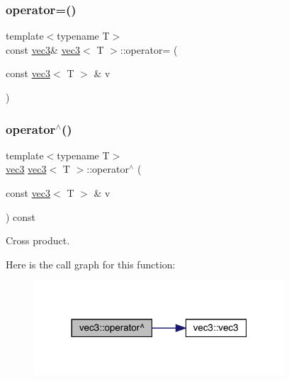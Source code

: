 \mbox{\label{structvec3_ad2cd7d64d02aa394c736ccc7054e5411}} 
\subsubsection{\texorpdfstring{operator=()}{operator=()}}
{\footnotesize\ttfamily template$<$typename T$>$ \\
const \mbox{\hyperlink{structvec3}{vec3}}\& \mbox{\hyperlink{structvec3}{vec3}}$<$ T $>$\+::operator= (\begin{DoxyParamCaption}\item[{const \mbox{\hyperlink{structvec3}{vec3}}$<$ T $>$ \&}]{v }\end{DoxyParamCaption})\hspace{0.3cm}{\ttfamily [inline]}}

\mbox{\label{structvec3_a6469fdfd7c378f5f30e299bc2e1e776a}} 
\subsubsection{\texorpdfstring{operator$^\wedge$()}{operator^()}}
{\footnotesize\ttfamily template$<$typename T$>$ \\
\mbox{\hyperlink{structvec3}{vec3}} \mbox{\hyperlink{structvec3}{vec3}}$<$ T $>$\+::operator$^\wedge$ (\begin{DoxyParamCaption}\item[{const \mbox{\hyperlink{structvec3}{vec3}}$<$ T $>$ \&}]{v }\end{DoxyParamCaption}) const\hspace{0.3cm}{\ttfamily [inline]}}



Cross product. 

Here is the call graph for this function\+:\nopagebreak
\begin{figure}[H]
\begin{center}
\leavevmode
\includegraphics[width=264pt]{structvec3_a6469fdfd7c378f5f30e299bc2e1e776a_cgraph}
\end{center}
\end{figure}
\mbox{\label{structvec3_afd43645a0cc5c449ae4b98f6d93774d2}} 
